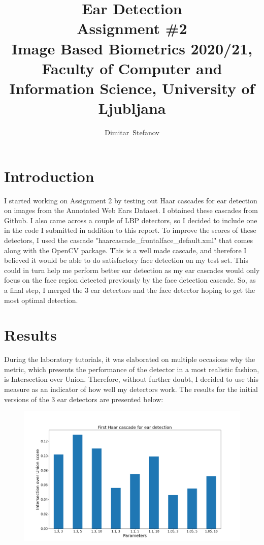 \documentclass[9pt]{IEEEtran}
\title{\vspace{0ex} %
Ear Detection
\\ \large{Assignment \#2}\\ \normalsize{Image Based Biometrics 2020/21, Faculty of Computer and Information Science, University of Ljubljana}}
\author{ %
Dimitar~Stefanov
\vspace{-4.0ex}
}
\begin{document}
\maketitle

\section{Introduction}
I started working on Assignment 2 by testing out Haar cascades for ear detection on images from the Annotated Web Ears Dataset. I obtained these cascades from Github. I also came across a couple of LBP detectors, so I decided to include one in the code I submitted in addition to this report. To improve the scores of these detectors, I used the cascade "haarcascade\_frontalface\_default.xml" that comes along with the OpenCV package. This is a well made cascade, and therefore I believed it would be able to do satisfactory face detection on my test set. This could in turn help me perform better ear detection as my ear cascades would only focus on the face region detected previously by the face detection cascade. So, as a final step, I merged the 3 ear detectors and the face detector hoping to get the most optimal detection.

\section{Results}
During the laboratory tutorials, it was elaborated on multiple occasions why the metric, which presents the performance of the detector in a most realistic fashion, is Intersection over Union. Therefore, without further doubt, I decided to use this measure as an indicator of how well my detectors work. The results for the initial versions of the 3 ear detectors are presented below:

\begin{figure}[H]
    \centering
    \includegraphics[width=1\columnwidth]{plot_1.1}
    \label{fig:plot_1.1}
\end{figure}
\end{document}
